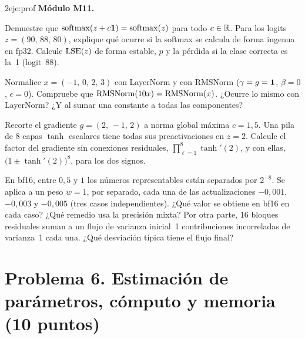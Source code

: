 \begin{ejercicio}{2}{eje:prof}
\textbf{Módulo M11.}
\begin{apartados}
  \item {} Demuestre que $\operatorname{softmax}(z+c\mathbf{1})=\operatorname{softmax}(z)$ para todo $c\in\mathbb{R}$. Para los logits $z=(90,\,88,\,80)$, explique qué ocurre si la softmax se calcula de forma ingenua en fp32. Calcule $\operatorname{LSE}(z)$ de forma estable, $p$ y la pérdida si la clase correcta es la~1 (logit~88).
  \item {} Normalice $x=(-1,\,0,\,2,\,3)$ con LayerNorm y con RMSNorm ($\gamma=g=\mathbf{1}$, $\beta=0$, $\epsilon=0$). Compruebe que $\operatorname{RMSNorm}(10x)=\operatorname{RMSNorm}(x)$. ¿Ocurre lo mismo con LayerNorm? ¿Y al sumar una constante a todas las componentes?
  \item {} Recorte el gradiente $g=(2,\,-1,\,2)$ a norma global máxima $c=1{,}5$. Una pila de 8 capas $\tanh$ escalares tiene todas sus preactivaciones en $z=2$. Calcule el factor del gradiente sin conexiones residuales, $\prod_{\ell=1}^{8}\tanh'(2)$, y con ellas, $\bigl(1\pm\tanh'(2)\bigr)^{8}$, para los dos signos.
  \item {} En bf16, entre $0{,}5$ y $1$ los números representables están separados por $2^{-8}$. Se aplica a un peso $w=1$, por separado, cada una de las actualizaciones $-0{,}001$, $-0{,}003$ y $-0{,}005$ (tres casos independientes). ¿Qué valor se obtiene en bf16 en cada caso? ¿Qué remedio usa la precisión mixta? Por otra parte, 16 bloques residuales suman a un flujo de varianza inicial~1 contribuciones incorreladas de varianza~1 cada una. ¿Qué desviación típica tiene el flujo final?
\end{apartados}
\end{ejercicio}

\section*{Problema 6. Estimación de parámetros, cómputo y memoria (10 puntos)}

